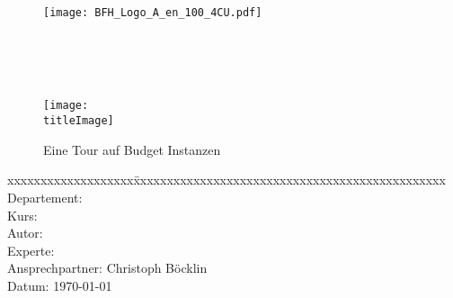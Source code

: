 \thispagestyle{empty}

\begin{figure}
	\texttt{[image: BFH\_Logo\_A\_en\_100\_4CU.pdf]}
\end{figure}


\begin{minipage}[c][3cm][c]{\linewidth} {
	\centering
	\vspace*{2cm}
	{\fontsize{24pt}{0pt}\selectfont \textbf{\doctitle}}  \\
	\vspace*{0.6cm}
	{\fontsize{20pt}{0pt}\selectfont {Geodatenprozessierung\\ mit Budget Instanzen}}  \\
	\vspace*{1cm}
	{\fontsize{14pt}{0pt}\selectfont \doctype}  \\
}
\end{minipage}


\vspace{1.5cm}


\begin{figure}[H]
	\centering
	\makebox[0.9\linewidth]{\color{BFHGray} \rule{0.9\linewidth}{10pt}}
	\texttt{[image: \\titleImage]}
	\makebox[0.9\linewidth]{\color{BFHGray} \rule{0.9\linewidth}{10pt}}
    \caption{Eine Tour auf Budget Instanzen\space\cite{HippieCar:1}}
\end{figure}

\vfill

\begin{minipage}[c][3cm][c]{\linewidth}
{
	\centering
	\begin{tabbing}
		xxxxxxxxxxxxxxxxxxx\=xxxxxxxxxxxxxxxxxxxxxxxxxxxxxxxxxxxxxxxxxxxxxxx \kill
		Departement:	\> \fieldofstudies \\
		Kurs:			\> \course \\
		Autor:		\> \docauthor \\%
		Experte:		\> \prof \\
		Ansprechpartner:      \> Christoph Böcklin \\
		Datum:			\> \today \\
	\end{tabbing}
}
\end{minipage}

\pagebreak